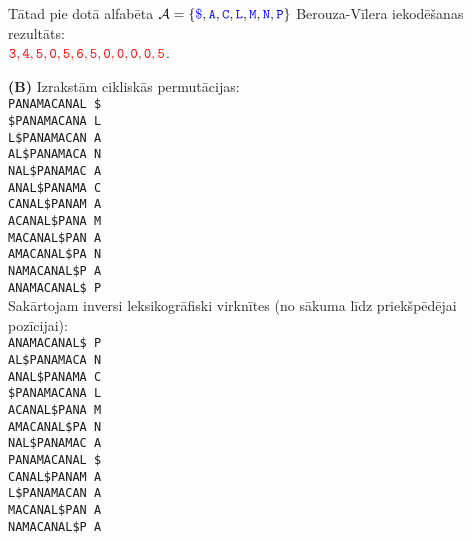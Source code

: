 \documentclass[a4paper,12pt]{article}
\begin{document}
{

Tātad pie dotā alfabēta 
$=\{\textcolor{blue}{\mathtt{\$}},\textcolor{blue}{},\textcolor{blue}{},
\textcolor{blue}{},\textcolor{blue}{},\textcolor{blue}{},\textcolor{blue}{} \}$
Berouza-Vīlera iekodēšanas rezultāts:\\
$\textcolor{red}{}$.



{\bf (B)} Izrakstām cikliskās permutācijas:\\

{\tt PANAMACANAL \$}\\
{\tt \$PANAMACANA L}\\
{\tt L\$PANAMACAN A}\\
{\tt AL\$PANAMACA N}\\
{\tt NAL\$PANAMAC A}\\
{\tt ANAL\$PANAMA C}\\
{\tt CANAL\$PANAM A}\\
{\tt ACANAL\$PANA M}\\
{\tt MACANAL\$PAN A}\\
{\tt AMACANAL\$PA N}\\
{\tt NAMACANAL\$P A}\\
{\tt ANAMACANAL\$ P}\\


Sakārtojam inversi leksikogrāfiski virknītes (no sākuma līdz priekšpēdējai pozīcijai):\\

{\tt ANAMACANAL\$ P}\\
{\tt AL\$PANAMACA N}\\
{\tt ANAL\$PANAMA C}\\
{\tt \$PANAMACANA L}\\
{\tt ACANAL\$PANA M}\\
{\tt AMACANAL\$PA N}\\
{\tt NAL\$PANAMAC A}\\
{\tt PANAMACANAL \$}\\
{\tt CANAL\$PANAM A}\\
{\tt L\$PANAMACAN A}\\
{\tt MACANAL\$PAN A}\\
{\tt NAMACANAL\$P A}\\


}
\end{document}
